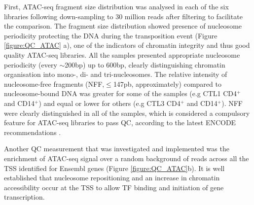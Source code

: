First, ATAC-seq fragment size distribution was analysed in each of the six libraries following down-sampling to 30 million reads after filtering to facilitate the comparison. The fragment size distribution showed presence of nucleosome periodicity protecting the DNA during the transposition event (Figure \ref{figure:QC_ATAC} a), one of the indicators of chromatin integrity and thus good quality ATAC-seq libraries. All the samples presented appropriate nucleosome periodicity (every $\sim$200bp) up to 600bp, clearly distinguishing chromatin organisation into mono-, di- and tri-nucleosomes. The relative intensity of nucleosome-free fragments (NFF,$\leq$147pb, approximately) compared to nucleosome-bound DNA was greater for some of the samples (e.g CTL1 CD4$^+$ and CD14$^+$) and equal or lower for others (e.g CTL3 CD4$^+$ and CD14$^+$). NFF were clearly distinguished in all of the samples, which is considered a compulsory feature for ATAC-seq libraries to pass QC, according to the latest ENCODE recommendations \parencite{ENCODE}.

Another QC measurement that was investigated and implemented was the enrichment of ATAC-seq signal over a random background of reads across all the TSS identified for Ensembl genes (Figure \ref{figure:QC_ATAC}b). It is well established that nucleosome repositioning and an increase in chromatin accessibility occur at the TSS to allow TF binding and initiation of gene transcription.

